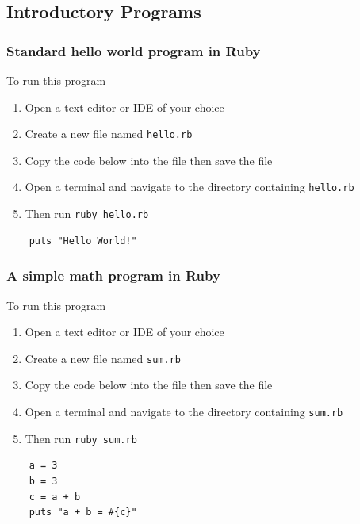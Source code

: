 \documentclass{article}
\begin{document}
\subsection{Introductory Programs}
  \subsubsection{Standard hello world program in Ruby}
  To run this program
  \begin{enumerate}
    \item Open a text editor or IDE of your choice
    \item Create a new file named \verb|hello.rb|
    \item Copy the code below into the file then save the file
    \item Open a terminal and navigate to the directory containing \verb|hello.rb|
    \item Then run \verb|ruby hello.rb|
  \end{enumerate}
  \begin{lstlisting}
    puts "Hello World!"
  \end{lstlisting}

  \subsubsection{A simple math program in Ruby}
  To run this program
  \begin{enumerate}
    \item Open a text editor or IDE of your choice
    \item Create a new file named \verb|sum.rb|
    \item Copy the code below into the file then save the file
    \item Open a terminal and navigate to the directory containing \verb|sum.rb|
    \item Then run \verb|ruby sum.rb|
  \end{enumerate}
  \begin{lstlisting}
    a = 3
    b = 3
    c = a + b
    puts "a + b = #{c}"
  \end{lstlisting}
\end{document}
